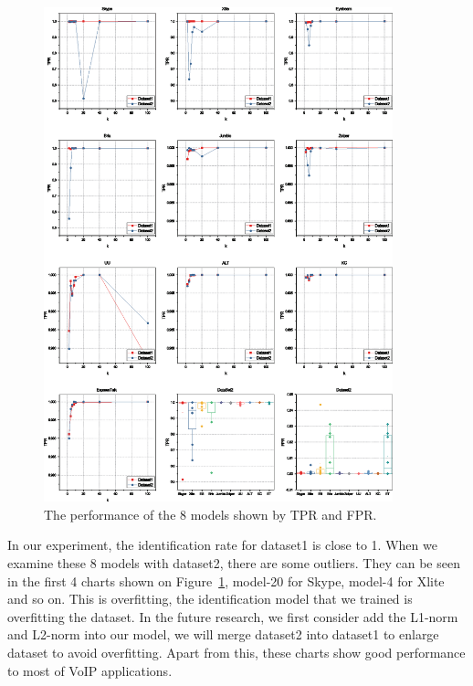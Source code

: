 \documentclass[conference]{IEEEtran}
\begin{document}
\begin{figure}[htp]
\begin{center}
\includegraphics[width=0.9\textwidth]{fprtpr.eps}
\caption{The performance of the 8 models shown by TPR and FPR.}\label{fig:fprtpr}
\end{center}
\end{figure}
In our experiment, the identification rate for dataset1 is close to 1. When we examine these 8 models with dataset2, there are some outliers. They can be seen in the first 4 charts shown on Figure~\ref{fig:fprtpr}, model-20 for Skype, model-4 for Xlite and so on. This is overfitting, the identification model that we trained is overfitting the dataset. In the future research, we first consider add the L1-norm and L2-norm into our model, we will merge dataset2 into dataset1 to enlarge dataset to avoid overfitting. Apart from this, these charts show good performance to most of VoIP applications.
\end{document}

